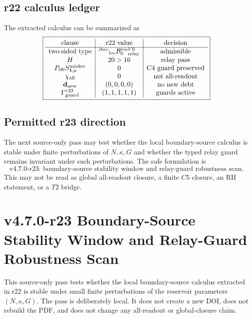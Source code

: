 \subsection{r22 calculus ledger}
\label{subsec:v470-r22-calculus-ledger}

The extracted calculus can be summarized as
\[
\boxed{
\begin{array}{c|c|c}
\text{clause} & \text{r22 value} & \text{decision}\\
\hline
\text{two-sided type} & {}^{\partial{\rm src}}{}_{\rm loc}\mathcal B_0^{\rm res}{}^{V0}_{\rm relay} & \text{admissible}\\
H & 20>16 & \text{relay pass}\\
P_{\partial0}S_{4,\mu}^{\rm mixker} & 0 & \text{C4 guard preserved}\\
\chi_{\rm all} & 0 & \text{not all-readout}\\
\mathbf d_{\rm new} & (0,0,0,0) & \text{no new debt}\\
\Gamma_{\rm guard}^{r22} & (1,1,1,1,1) & \text{guards active}
\end{array}
}
\]

\subsection{Permitted r23 direction}
\label{subsec:v470-r22-permitted-r23-direction}

The next source-only pass may test whether the local boundary-source calculus is
stable under finite perturbations of \(N,\kappa,G\) and whether the typed relay
guard remains invariant under such perturbations.  The safe formulation is
\[
\boxed{
\text{v4.7.0-r23: boundary-source stability window and relay-guard robustness scan.}
}
\]
This may not be read as global all-readout closure, a finite \(C5\) closure, an
RH statement, or a \(T2\) bridge.



\section{v4.7.0-r23 Boundary-Source Stability Window and Relay-Guard Robustness Scan}
\label{sec:v470-r23-boundary-source-stability-window}

This source-only pass tests whether the local boundary-source calculus extracted
in r22 is stable under small finite perturbations of the reservoir parameters
\((N,\kappa,G)\).  The pass is deliberately local.  It does not create a new DOI,
does not rebuild the PDF, and does not change any all-readout or global-closure
claim.


